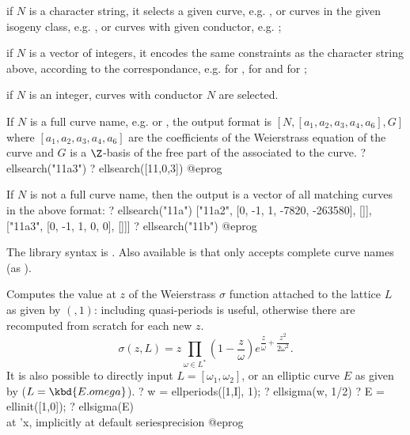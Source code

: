 \item if $N$ is a character string, it selects a given curve, e.g.
, or curves in the given isogeny class, e.g. , or
curves with given conductor, e.g. ;

\item if $N$ is a vector of integers, it encodes the same constraints
as the character string above, according to the 
correspondance, e.g. \kbd{[11,0,1]} for , \kbd{[11,0]} for
 and \kbd{[11]} for ;

\item if $N$ is an integer, curves with conductor $N$ are selected.

If $N$ is a full curve name, e.g.  or \kbd{[11,0,1]},
the output format is $[N, [a_1,a_2,a_3,a_4,a_6], G]$ where
$[a_1,a_2,a_3,a_4,a_6]$ are the coefficients of the Weierstrass equation of
the curve and $G$ is a $\Z$-basis of the free part of the  associated to the curve.
\bprog
? ellsearch("11a3")
? ellsearch([11,0,3])
@eprog\noindent

If $N$ is not a full curve name, then the output is a vector of all matching
curves in the above format:
\bprog
? ellsearch("11a")
      ["11a2", [0, -1, 1, -7820, -263580], []],
      ["11a3", [0, -1, 1, 0, 0], []]]
? ellsearch("11b")
@eprog

The library syntax is .
Also available is  that only
accepts complete curve names (as ).

\label{se:ellsigma}
Computes the value at $z$ of the Weierstrass $\sigma$ function attached to
the lattice $L$ as given by $(,1)$: including quasi-periods
is useful, otherwise there are recomputed from scratch for each new $z$.
$$ \sigma(z, L) = z \prod_{\omega\in L^*} \left(1 -
\dfrac{z}{\omega}\right)e^{\dfrac{z}{\omega} + \dfrac{z^2}{2\omega^2}}.$$
It is also possible to directly input $L = [\omega_1,\omega_2]$,
or an elliptic curve $E$ as given by  ($L = \kbd{E.omega}$).
\bprog
? w = ellperiods([1,I], 1);
? ellsigma(w, 1/2)
? E = ellinit([1,0]);
? ellsigma(E) \\ at 'x, implicitly at default seriesprecision
@eprog

